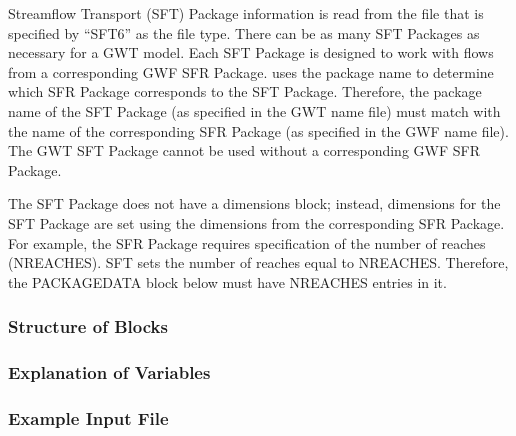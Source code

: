 Streamflow Transport (SFT) Package information is read from the file that is specified by ``SFT6'' as the file type.  There can be as many SFT Packages as necessary for a GWT model. Each SFT Package is designed to work with flows from a corresponding GWF SFR Package. \mf uses the package name to determine which SFR Package corresponds to the SFT Package.  Therefore, the package name of the SFT Package (as specified in the GWT name file) must match with the name of the corresponding SFR Package (as specified in the GWF name file).  The GWT SFT Package cannot be used without a corresponding GWF SFR Package.

The SFT Package does not have a dimensions block; instead, dimensions for the SFT Package are set using the dimensions from the corresponding SFR Package.  For example, the SFR Package requires specification of the number of reaches (NREACHES).  SFT sets the number of reaches equal to NREACHES.  Therefore, the PACKAGEDATA block below must have NREACHES entries in it.

\vspace{5mm}
\subsubsection{Structure of Blocks}




\vspace{5mm}
\subsubsection{Explanation of Variables}
\begin{description}

\end{description}

\vspace{5mm}
\subsubsection{Example Input File}


